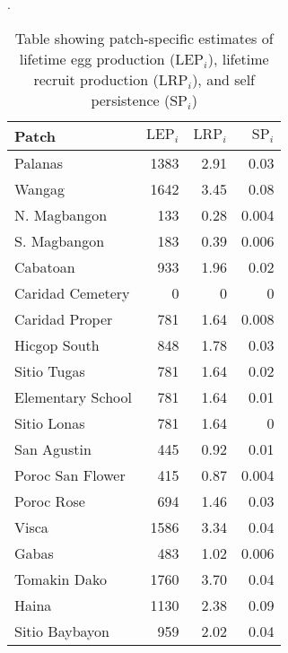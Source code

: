 \documentclass[12pt, oneside]{article}   	%
\begin{document}
\begin{table}[!htbp]
\caption{Table showing patch-specific estimates of lifetime egg production ($\text{LEP}_i$), lifetime recruit production ($\text{LRP}_i$), and self persistence ($\text{SP}_i$)}. \label{APP_TAB_PatchSpecificLEPandLRP}
\begin{centering}
\begin{tabular}{|l|r|r|r|}
\hline 
Patch & $\text{LEP}_i$ & $\text{LRP}_i$ & $\text{SP}_i$ \\ \hline
Palanas & 1383 & 2.91 & 0.03 \\ \hline  
Wangag & 1642 & 3.45 & 0.08 \\ \hline  
N. Magbangon & 133 & 0.28 & 0.004 \\ \hline
S. Magbangon & 183 & 0.39 & 0.006 \\ \hline
Cabatoan & 933 & 1.96 & 0.02 \\ \hline
Caridad Cemetery & 0 & 0 & 0 \\ \hline
Caridad Proper & 781 & 1.64 & 0.008 \\ \hline 
Hicgop South & 848 & 1.78 & 0.03 \\ \hline
Sitio Tugas & 781 & 1.64 & 0.02 \\ \hline  
Elementary School & 781 & 1.64 & 0.01 \\ \hline  
Sitio Lonas & 781 & 1.64 & 0 \\ \hline  
San Agustin & 445 & 0.92 & 0.01 \\ \hline  
Poroc San Flower & 415 & 0.87 & 0.004 \\ \hline
Poroc Rose & 694 & 1.46 & 0.03 \\ \hline
Visca & 1586 & 3.34 & 0.04 \\ \hline
Gabas & 483 & 1.02 & 0.006 \\ \hline
Tomakin Dako & 1760 & 3.70 & 0.04 \\ \hline  
Haina & 1130 & 2.38 & 0.09 \\ \hline
Sitio Baybayon & 959 & 2.02 & 0.04\\ \hline  
\end{tabular}
\end{centering}
\end{table}
\end{document}
